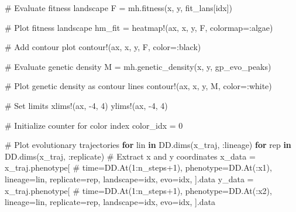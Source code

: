 \documentclass[
]{scrartcl}
\newenvironment{Shaded}{\begin{snugshade}}{\end{snugshade}}
\newcommand{\CommentTok}[1]{\textcolor[rgb]{0.37,0.37,0.37}{#1}}
\newcommand{\ControlFlowTok}[1]{\textcolor[rgb]{0.00,0.23,0.31}{\textbf{#1}}}
\newcommand{\FloatTok}[1]{\textcolor[rgb]{0.68,0.00,0.00}{#1}}
\newcommand{\FunctionTok}[1]{\textcolor[rgb]{0.28,0.35,0.67}{#1}}
\newcommand{\KeywordTok}[1]{\textcolor[rgb]{0.00,0.23,0.31}{\textbf{#1}}}
\newcommand{\NormalTok}[1]{\textcolor[rgb]{0.00,0.23,0.31}{#1}}
\newcommand{\OperatorTok}[1]{\textcolor[rgb]{0.37,0.37,0.37}{#1}}
\begin{document}
\begin{Shaded}
\begin{Highlighting}[]
    \CommentTok{\# Evaluate fitness landscape}
\NormalTok{    F }\OperatorTok{=}\NormalTok{ mh.}\FunctionTok{fitness}\NormalTok{(x, y, fit\_lans[idx])}

    \CommentTok{\# Plot fitness landscape}
\NormalTok{    hm\_fit }\OperatorTok{=} \FunctionTok{heatmap!}\NormalTok{(ax, x, y, F, colormap}\OperatorTok{=:}\NormalTok{algae)}

    \CommentTok{\# Add contour plot}
    \FunctionTok{contour!}\NormalTok{(ax, x, y, F, color}\OperatorTok{=:}\NormalTok{black)}

    \CommentTok{\# Evaluate genetic density}
\NormalTok{    M }\OperatorTok{=}\NormalTok{ mh.}\FunctionTok{genetic\_density}\NormalTok{(x, y, gp\_evo\_peaks)}

    \CommentTok{\# Plot genetic density as contour lines}
    \FunctionTok{contour!}\NormalTok{(ax, x, y, M, color}\OperatorTok{=:}\NormalTok{white)}

    \CommentTok{\# Set limits}
    \FunctionTok{xlims!}\NormalTok{(ax, }\OperatorTok{{-}}\FloatTok{4}\NormalTok{, }\FloatTok{4}\NormalTok{)}
    \FunctionTok{ylims!}\NormalTok{(ax, }\OperatorTok{{-}}\FloatTok{4}\NormalTok{, }\FloatTok{4}\NormalTok{)}

    \CommentTok{\# Initialize counter for color index}
\NormalTok{    color\_idx }\OperatorTok{=} \FloatTok{0}

    \CommentTok{\# Plot evolutionary trajectories}
    \ControlFlowTok{for}\NormalTok{ lin }\KeywordTok{in}\NormalTok{ DD.}\FunctionTok{dims}\NormalTok{(x\_traj, }\OperatorTok{:}\NormalTok{lineage)}
        \ControlFlowTok{for}\NormalTok{ rep }\KeywordTok{in}\NormalTok{ DD.}\FunctionTok{dims}\NormalTok{(x\_traj, }\OperatorTok{:}\NormalTok{replicate)}
            \CommentTok{\# Extract x and y coordinates}
\NormalTok{            x\_data }\OperatorTok{=}\NormalTok{ x\_traj.phenotype[}
                \CommentTok{\# time=DD.At(1:n\_steps+1),}
\NormalTok{                phenotype}\OperatorTok{=}\NormalTok{DD.}\FunctionTok{At}\NormalTok{(}\OperatorTok{:}\NormalTok{x1),}
\NormalTok{                lineage}\OperatorTok{=}\NormalTok{lin,}
\NormalTok{                replicate}\OperatorTok{=}\NormalTok{rep,}
\NormalTok{                landscape}\OperatorTok{=}\NormalTok{idx,}
\NormalTok{                evo}\OperatorTok{=}\NormalTok{idx,}
\NormalTok{            ].data}
\NormalTok{            y\_data }\OperatorTok{=}\NormalTok{ x\_traj.phenotype[}
                \CommentTok{\# time=DD.At(1:n\_steps+1),}
\NormalTok{                phenotype}\OperatorTok{=}\NormalTok{DD.}\FunctionTok{At}\NormalTok{(}\OperatorTok{:}\NormalTok{x2),}
\NormalTok{                lineage}\OperatorTok{=}\NormalTok{lin,}
\NormalTok{                replicate}\OperatorTok{=}\NormalTok{rep,}
\NormalTok{                landscape}\OperatorTok{=}\NormalTok{idx,}
\NormalTok{                evo}\OperatorTok{=}\NormalTok{idx,}
\NormalTok{            ].data}


\end{Highlighting}
\end{Shaded}
\end{document}

